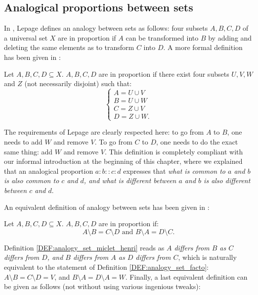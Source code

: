 \subsection{Analogical proportions between sets}

In \cite{Lep03}, Lepage defines an analogy between sets as follows: four subsets
$A, B, C, D$ of a universal set $X$ are in proportion if $A$ can be transformed
into $B$ by adding and deleting the same elements as to transform $C$ into $D$.
A more formal definition has been given in \cite{StrYvoREPORT05}:

\begin{definition}
  \label{DEF:analogy_set_facto}
  Let $A, B, C, D \subseteq X$. $A, B, C, D$ are in proportion if there exist
  four subsets $U, V, W$ and $Z$ (not necessarily disjoint) such that:
  $$
  \begin{cases}
    A = U \cup V\\
    B = U \cup W\\
    C = Z \cup V\\
    D = Z \cup W.
  \end{cases}
  $$
\end{definition}

The requirements of Lepage are clearly respected here: to go from $A$ to $B$,
one needs to add $W$ and remove $V$. To go from $C$ to $D$, one needs to do the
exact same thing: add $W$ and remove $V$. This definition is completely
compliant with our informal introduction at the beginning of this chapter,
where we explained that an analogical proportion $a:b::c:d$ expresses that
\textit{what is common to $a$ and $b$ is also common to $c$ and $d$, and what
is different between $a$ and $b$ is also different between $c$ and $d$}.


An equivalent definition of analogy between sets has been given in
\cite{MicPra09}:

\begin{definition}
  \label{DEF:analogy_set_miclet_henri}
  Let $A, B, C, D \subseteq X$. $A, B, C, D$ are in proportion if:
  $$
  A \setminus B = C \setminus D \text{ and } B \setminus A = D \setminus C.
  $$
\end{definition}

Definition \ref{DEF:analogy_set_miclet_henri} reads as \textit{$A$ differs from
$B$ as $C$ differs from $D$, and $B$ differs from $A$ as $D$ differs from $C$},
which is naturally equivalent to the statement of Definition
\ref{DEF:analogy_set_facto}: $A \setminus B = C \setminus D = V$, and $B
\setminus A = D \setminus A  = W$.  Finally, a last equivalent definition can
be given as follows (not without using various ingenious tweaks):

